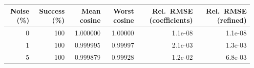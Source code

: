 \begin{tabular}{r r r r r r}
\toprule
Noise (\%) & Success (\%) & Mean cosine & Worst cosine & Rel.\ RMSE (coefficients) & Rel.\ RMSE (refined)\\
\midrule
0 & 100 & 1.000000 & 1.00000 & 1.1e-08 & 1.1e-08 \\
1 & 100 & 0.999995 & 0.99997 & 2.1e-03 & 1.3e-03 \\
5 & 100 & 0.999879 & 0.99928 & 1.2e-02 & 6.8e-03 \\
\bottomrule
\end{tabular}
